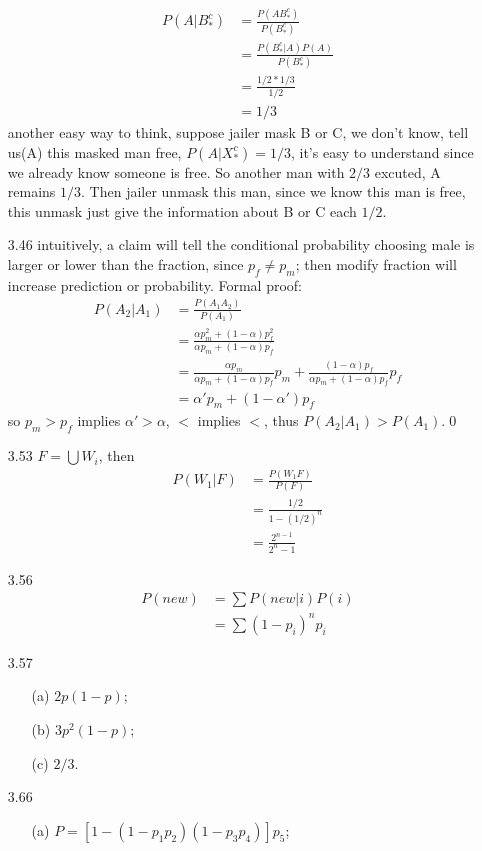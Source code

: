 \documentclass[paper=a4, fontsize=11pt]{scrartcl} %
\numberwithin{equation}{section} %
\numberwithin{figure}{section} %
\numberwithin{table}{section} %
\begin{document}
\begin{itemize}
\begin{align}
	P(A|B_*^c) &= \frac{P(AB_*^c)}{P(B_*^c)} \\
		&= \frac{P(B_*^c|A)P(A)}{P(B_*^c)} \\
		&= \frac{1/2 * 1/3} {1/2} \\
		&= 1/3
	\end{align}
	another easy way to think, suppose jailer mask B or C, we don't know, tell us(A) this masked man free, $P(A|X_*^c)=1/3$, it's easy to understand since we already know someone is free. So another man with $2/3$ excuted, A remains $1/3$. Then jailer unmask this man, since we know this man is free, this unmask just give the information about B or C each $1/2$.
	\item[3.46] intuitively, a claim will tell the conditional probability choosing male is larger or lower than the fraction, since $p_f\neq p_m$; then modify fraction will increase prediction or probability. Formal proof:
	\begin{align}
		P(A_2|A_1) &= \frac{P(A_1A_2)} {P(A_1)} \\
			&= \frac{\alpha p_m^2 + (1-\alpha)p_f^2} {\alpha p_m + (1-\alpha)p_f} \\
			&= \frac{\alpha p_m}{\alpha p_m + (1-\alpha)p_f} p_m  + \frac{(1-\alpha)p_f}{\alpha p_m + (1-\alpha)p_f}p_f \\
			&= \alpha'p_m + (1-\alpha')p_f
	\end{align}
	so $p_m>p_f$ implies $\alpha'>\alpha$, $<$ implies $<$, thus $P(A_2|A_1)>P(A_1)$.\qed
	\item[3.53] $F=\bigcup W_i$, then
	\begin{align}
		P(W_1| F) &= \frac{P(W_1F)}{P(F)} \\
			&= \frac{1/2}{1-(1/2)^n} \\
			&= \frac{2^{n-1}}{2^n -1}
	\end{align}
	\item[3.56] 
	\begin{align}
		P(new) &= \sum P(new|i)P(i) \\
			&= \sum (1-p_i)^n p_i
	\end{align}
	\item[3.57]
	\begin{itemize}
		\item[(a)] $2p(1-p)$;
		\item[(b)] $3p^2(1-p)$;
		\item[(c)] $2/3$.
	\end{itemize}
	\item[3.66]
	\begin{itemize}
		\item[(a)] $P = [1-(1-p_1p_2)(1-p_3p_4)]p_5$;

\end{itemize}
\end{itemize}
\end{document}
